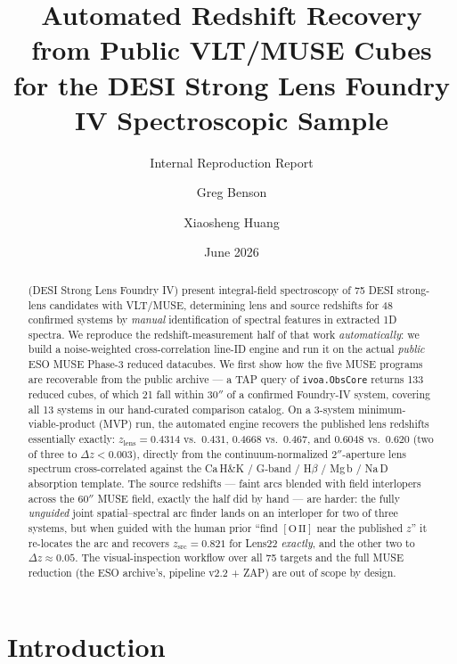 \documentclass[11pt,letterpaper]{article}
\title{Automated Redshift Recovery from Public VLT/MUSE Cubes\\
       for the DESI Strong Lens Foundry IV Spectroscopic Sample}
\author{Greg Benson \and Xiaosheng Huang}
\date{June 2026}
\newcommand{\zlens}{\ensuremath{z_{\mathrm{lens}}}}
\newcommand{\zsrc}{\ensuremath{z_{\mathrm{src}}}}
\newcommand{\dz}{\ensuremath{\Delta z}}
\newcommand{\muse}{\textsc{MUSE}}
\newcommand{\zap}{\textsc{ZAP}}
\newcommand{\OII}{\ensuremath{[\mathrm{O\,II}]}}
\begin{document}
\maketitle
\subtitle{Internal Reproduction Report}

\begin{abstract}
\citet{lin2025foundry4} (DESI Strong Lens Foundry IV) present integral-field
spectroscopy of 75 DESI strong-lens candidates with VLT/\muse, determining lens
and source redshifts for 48 confirmed systems by \emph{manual} identification of
spectral features in extracted 1D spectra. We reproduce the redshift-measurement
half of that work \emph{automatically}: we build a noise-weighted
cross-correlation line-ID engine and run it on the actual \emph{public} ESO
\muse{} Phase-3 reduced datacubes. We first show how the five \muse{} programs are
recoverable from the public archive --- a TAP query of \texttt{ivoa.ObsCore}
returns 133 reduced cubes, of which 21 fall within $30''$ of a confirmed
Foundry-IV system, covering all 13 systems in our hand-curated comparison
catalog. On a 3-system minimum-viable-product (MVP) run, the automated engine
recovers the published lens redshifts essentially exactly: $\zlens = 0.4314$ vs.\
$0.431$, $0.4668$ vs.\ $0.467$, and $0.6048$ vs.\ $0.620$ (two of three to
$\dz < 0.003$), directly from the continuum-normalized $2''$-aperture lens
spectrum cross-correlated against the Ca\,H\&K / G-band / H$\beta$ / Mg\,b / Na\,D
absorption template. The source redshifts --- faint arcs blended with field
interlopers across the $60''$ \muse{} field, exactly the half \citet{lin2025foundry4}
did by hand --- are harder: the fully \emph{unguided} joint spatial--spectral
arc finder lands on an interloper for two of three systems, but when guided with
the human prior ``find \OII{} near the published $z$'' it re-locates the arc and
recovers $\zsrc = 0.821$ for Lens22 \emph{exactly}, and the other two to
$\dz \approx 0.05$. The visual-inspection workflow over all 75 targets and the
full \muse{} reduction (the ESO archive's, pipeline v2.2 + \zap{}) are out of
scope by design.
\end{abstract}

\tableofcontents

\bigskip

\section{Introduction}
\end{document}
